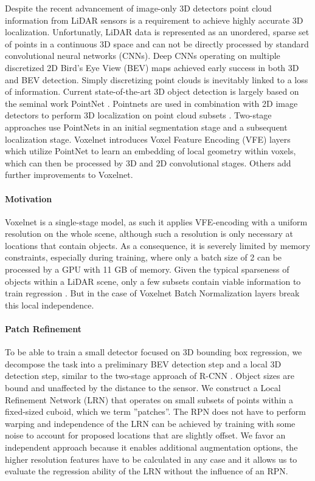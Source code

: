 \documentclass{article}
\begin{document}
Despite the recent advancement of image-only 3D detectors \cite{wangcvpr2019,licvpr2019} point cloud information from LiDAR sensors is a requirement to achieve highly accurate 3D localization. Unfortunatly, LiDAR data is represented as an unordered, sparse set of points in a continuous 3D space and can not be directly processed by standard convolutional neural networks (CNNs).
Deep CNNs operating on multiple discretized 2D Bird's Eye View (BEV) maps achieved early success in both 3D \cite{Chen2017multiview,Ku2018avod} and BEV \cite{Yang2018pixor} detection. Simply discretizing point clouds is inevitably linked to a loss of information.
Current state-of-the-art 3D object detection is largely based on the seminal work PointNet \cite{Qi2017pointnet}. Pointnets are used in combination with 2D image detectors to perform 3D localization on point cloud subsets \cite{Qi2018fpointnet,Shin2018roar}. Two-stage approaches \cite{Shi2019pointrcnn} use PointNets in an initial segmentation stage and a subsequent localization stage.
Voxelnet \cite{Zhou2018voxel} introduces Voxel Feature Encoding (VFE) layers which utilize PointNet to learn an embedding of local geometry within voxels, which can then be processed by 3D and 2D convolutional stages. Others \cite{Yan2018second,Lang2019pointpillars} add further improvements to Voxelnet.

\paragraph{Motivation} Voxelnet is a single-stage model, as such it applies VFE-encoding with a uniform resolution on the whole scene, although such a resolution is only necessary at locations that contain objects. As a consequence, it is severely limited by memory constraints, especially during training, where only a batch size of 2 can be processed by a GPU with 11 GB of memory. Given the typical sparseness of objects within a LiDAR scene, only a few subsets contain viable information to train regression \cite{Engelcke2017vote3deep}. But in the case of Voxelnet Batch Normalization layers \cite{Ioffe2015batchnorm} break this local independence.

\paragraph{Patch Refinement} To be able to train a small detector focused on 3D bounding box regression, we decompose the task into a preliminary BEV detection step and a local 3D detection step, similar to the two-stage approach of R-CNN \cite{Girshick2014rich}. Object sizes are bound and unaffected by the distance to the sensor. We construct a Local Refinement Network (LRN) that operates on small subsets of points within a fixed-sized cuboid, which we term ''patches''. The RPN does not have to perform warping and independence of the LRN can be achieved by training with some noise to account for proposed locations that are slightly offset. We favor an independent approach because it enables additional augmentation options, the higher resolution features have to be calculated in any case and it allows us to evaluate the regression ability of the LRN without the influence of an RPN.
\end{document}
